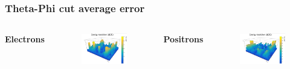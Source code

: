 \documentclass{beamer}
\begin{document}
		\begin{frame}
			\frametitle{Theta-Phi cut average error}
			\begin{columns}
				\centering
				\Large \textbf{Electrons}
				\begin{figure}
					\centering
					\includegraphics[width = 0.95 \linewidth]{../images/c_e_theta_phi_abs.png}
				\end{figure}
				\centering
				\Large \textbf{Positrons}
				\begin{figure}
					\centering
					\includegraphics[width = 0.95 \linewidth]{../images/c_p_theta_phi_abs.png}
				\end{figure}
			\end{columns}
		\end{frame}
\end{document}
